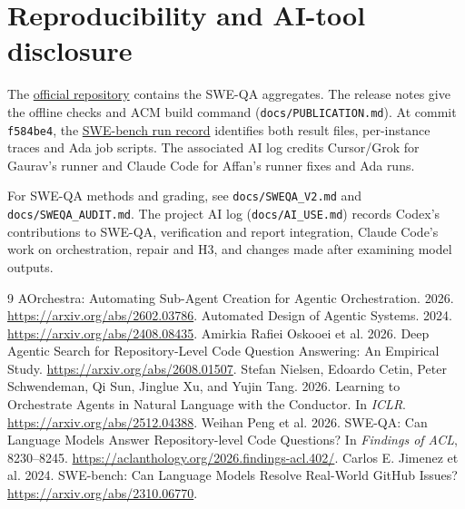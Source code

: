 \documentclass[sigconf,nonacm]{acmart}
\newcommand{\artifact}[1]{\nolinkurl{#1}}
\begin{document}
\section{Reproducibility and AI-tool disclosure}
The \href{https://github.com/Gaurav7888/HarnessSpec}{official repository}
contains the SWE-QA aggregates. The release notes give the offline checks and ACM build command
(\artifact{docs/PUBLICATION.md}). At commit \texttt{f584be4}, the
\href{https://github.com/Gaurav7888/HarnessSpec/blob/f584be43a85ad577b7439172ef1b51f197da80c1/docs/SWEBENCH.md}{SWE-bench run record}
identifies both result files, per-instance traces and Ada job scripts.
The associated AI log credits Cursor/Grok for Gaurav's runner and Claude
Code for Affan's runner fixes and Ada runs.

For SWE-QA methods and grading, see \artifact{docs/SWEQA_V2.md} and
\artifact{docs/SWEQA_AUDIT.md}. The project AI log
(\artifact{docs/AI_USE.md}) records Codex's contributions to SWE-QA,
verification and report integration, Claude Code's work on orchestration,
repair and H3, and changes made after examining model outputs.

\begin{thebibliography}{9}
AOrchestra: Automating Sub-Agent Creation for Agentic Orchestration.
2026. \url{https://arxiv.org/abs/2602.03786}.
Automated Design of Agentic Systems. 2024.
\url{https://arxiv.org/abs/2408.08435}.
Amirkia Rafiei Oskooei et al. 2026.
Deep Agentic Search for Repository-Level Code Question Answering:
An Empirical Study. \url{https://arxiv.org/abs/2608.01507}.
Stefan Nielsen, Edoardo Cetin, Peter Schwendeman, Qi Sun, Jinglue Xu, and
Yujin Tang. 2026. Learning to Orchestrate Agents in Natural Language with the
Conductor. In \emph{ICLR}. \url{https://arxiv.org/abs/2512.04388}.
Weihan Peng et al. 2026. SWE-QA: Can Language Models Answer
Repository-level Code Questions? In \emph{Findings of ACL}, 8230--8245.
\url{https://aclanthology.org/2026.findings-acl.402/}.
Carlos E. Jimenez et al. 2024. SWE-bench: Can Language Models Resolve
Real-World GitHub Issues? \url{https://arxiv.org/abs/2310.06770}.
\end{thebibliography}
\end{document}

